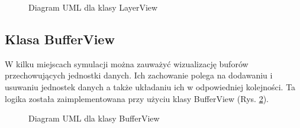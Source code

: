 \begin{figure}[ht]
	\centerline{}
	\caption{Diagram UML dla klasy LayerView}
	\label{fig:layer_view_class}
\end{figure}

\subsection{Klasa BufferView}

W kilku miejscach symulacji można zauważyć wizualizację buforów przechowujących jednostki danych. Ich zachowanie polega na dodawaniu i usuwaniu jednostek danych a także układaniu ich w odpowiedniej kolejności. Ta logika została zaimplementowana przy użyciu klasy BufferView (Rys. \ref{fig:buffer_view_class}).

\begin{figure}[ht]
	\centerline{}
	\caption{Diagram UML dla klasy BufferView}
	\label{fig:buffer_view_class}
\end{figure}